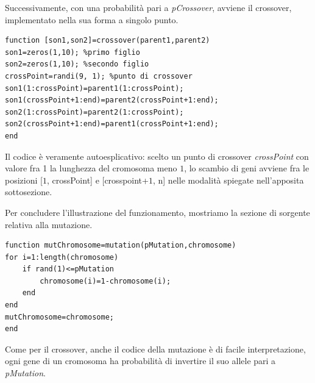 Successivamente, con una probabilit\`a pari a \textit{pCrossover}, avviene il crossover, implementato nella sua forma a singolo punto.
\begin{lstlisting}[style=matlab, style=matlab2, style=matlab3]
function [son1,son2]=crossover(parent1,parent2)
son1=zeros(1,10); %primo figlio
son2=zeros(1,10); %secondo figlio
crossPoint=randi(9, 1); %punto di crossover
son1(1:crossPoint)=parent1(1:crossPoint);
son1(crossPoint+1:end)=parent2(crossPoint+1:end);
son2(1:crossPoint)=parent2(1:crossPoint);
son2(crossPoint+1:end)=parent1(crossPoint+1:end);
end
\end{lstlisting}
Il codice \`e veramente autoesplicativo: scelto un punto di crossover
\textit{crossPoint} con valore fra 1 la lunghezza del cromosoma meno $1$, lo scambio di geni avviene fra le posizioni [$1$, crossPoint] e [crosspoint+$1$, n] nelle modalit\`a spiegate nell'apposita sottosezione.
\vspace{3mm}

Per concludere l'illustrazione del funzionamento, mostriamo la sezione di sorgente relativa alla mutazione.
\begin{lstlisting}[style=matlab, style=matlab2, style=matlab3]
function mutChromosome=mutation(pMutation,chromosome)
for i=1:length(chromosome)
    if rand(1)<=pMutation
        chromosome(i)=1-chromosome(i);
    end
end
mutChromosome=chromosome;
end
\end{lstlisting}
Come per il crossover, anche il codice della mutazione \`e di facile interpretazione, ogni gene di un cromosoma ha probabilit\`a di invertire il suo allele pari a \textit{pMutation}.
